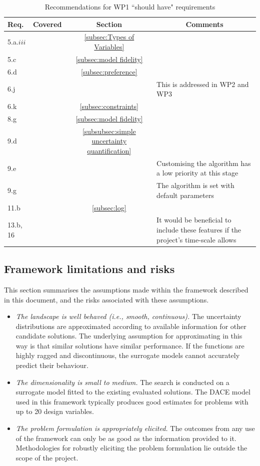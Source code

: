 \documentclass[a4paper]{article}
\newcommand{\cmark}{\ding{51}}%
\newcommand{\xmark}{\ding{55}}%
\begin{document}
\begin{table}
\caption{Recommendations for WP1 ``should have" requirements}
\begin{tabularx}{\textwidth}{lccX} \toprule
{\bf Req.}	& {\bf Covered}	& {\bf Section}						& \multicolumn{1}{c}{\bf Comments}	\\ \midrule
5.a.$iii$	&  \cmark 		& \ref{subsec:Types of Variables}	& 									\\
5.c			&  \cmark 		& \ref{subsec:model fidelity}		& 									\\
6.d			&  \cmark 		& \ref{subsec:preference}			& 									\\
6.j			&  \xmark 		& 									& This is addressed in WP2 and WP3	\\
6.k			&  \cmark 		& \ref{subsec:constraints}			& 									\\
8.g			&  \cmark 		& \ref{subsec:model fidelity}		& 									\\
9.d			&  \cmark 		& \ref{subsubsec:simple uncertainty quantification}	& 					\\
9.e			&  \xmark 		& 									& Customising the algorithm has a low priority at this stage \\
9.g			&  \cmark 		& 									& The algorithm is set with default parameters \\
11.b		&  \cmark		& \ref{subsec:log}					& 									\\
13.b, 16	&  \xmark		& 									& It would be beneficial to include these features if the project's time-scale allows \\
\bottomrule
\end{tabularx}
\label{tab:should have requirements}
\end{table}

\subsection{Framework limitations and risks}
This section summarises the assumptions made within the framework described in this document, and the risks associated with these assumptions.
\begin{itemize}
	\item \emph{The landscape is well behaved (i.e., smooth, continuous).} The uncertainty distributions are approximated according to available information for other candidate solutions. The underlying assumption for approximating in this way is that similar solutions have similar performance. If the functions are highly ragged and discontinuous, the surrogate models cannot accurately predict their behaviour.
	\item \emph{The dimensionality is small to medium.} The search is conducted on a surrogate model fitted to the existing evaluated solutions. The DACE model used in this framework typically produces good estimates for problems with up to 20 design variables.
	\item \emph{The problem formulation is appropriately elicited.} The outcomes from any use of the framework can only be as good as the information provided to it. Methodologies for robustly eliciting the problem formulation lie outside the scope of the project.
\end{itemize}
\end{document}
